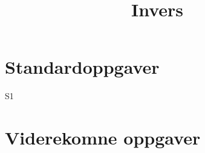 \documentclass[a4paper,norsk,11pt]{interaktiv}
\title{Invers}
\begin{document}

\maketitle


\begin{tcolorbox}
\end{tcolorbox}



\section*{Standardoppgaver}


\begin{oppgave}{S1}
\end{oppgave}

\section*{Viderekomne oppgaver}
\end{document}
